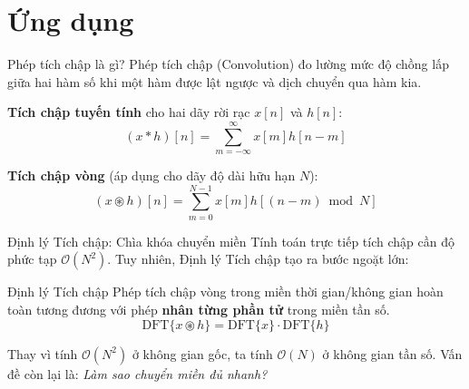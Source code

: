 \section{Ứng dụng}

\begin{frame}{Phép tích chập là gì?}
    Phép tích chập (Convolution) đo lường mức độ chồng lấp giữa hai hàm số khi một hàm được lật ngược và dịch chuyển qua hàm kia.
    \vspace{0.5cm}
    
    \textbf{Tích chập tuyến tính} cho hai dãy rời rạc $x[n]$ và $h[n]$:
    $$(x * h)[n] = \sum_{m=-\infty}^{\infty} x[m] h[n - m]$$
    \vspace{0.3cm}
    
    \textbf{Tích chập vòng} (áp dụng cho dãy độ dài hữu hạn $N$):
    $$(x \circledast h)[n] = \sum_{m=0}^{N-1} x[m] h[(n - m) \bmod N]$$
\end{frame}

\begin{frame}{Định lý Tích chập: Chìa khóa chuyển miền}
    Tính toán trực tiếp tích chập cần độ phức tạp $\mathcal{O}(N^2)$. Tuy nhiên, Định lý Tích chập tạo ra bước ngoặt lớn:
    \vspace{0.5cm}
    
    \begin{block}{Định lý Tích chập}
        Phép tích chập vòng trong miền thời gian/không gian hoàn toàn tương đương với phép \textbf{nhân từng phần tử} trong miền tần số.
        $$\text{DFT}\{x \circledast h\} = \text{DFT}\{x\} \cdot \text{DFT}\{h\}$$
    \end{block}
    \vspace{0.5cm}
    
    Thay vì tính $\mathcal{O}(N^2)$ ở không gian gốc, ta tính $\mathcal{O}(N)$ ở không gian tần số. Vấn đề còn lại là: \textit{Làm sao chuyển miền đủ nhanh?}
\end{frame}

